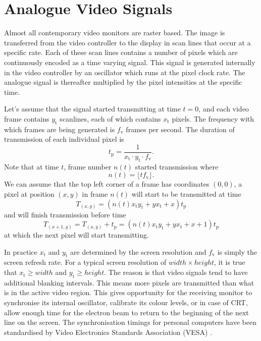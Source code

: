 \documentclass[a4paper,12pt,twoside,openright]{report}
\begin{document}
\section{Analogue Video Signals}

Almost all contemporary video monitors are raster based. The image is transferred from the video controller to the display in scan lines that occur at a specific rate. Each of these scan lines contains a number of pixels which are continuously encoded as a time varying signal. This signal is generated internally in the video controller by an oscillator which runs at the pixel clock rate. The analogue signal is thereafter multiplied by the pixel intensities at the specific time.

Let's assume that the signal started transmitting at time $t=0$, and each video frame contains $y_\text{t}$ scanlines, each of which contains $x_\text{t}$ pixels. The frequency with which frames are being generated is $f_\text{v}$ frames per second. The duration of transmission of each individual pixel is \begin{equation}
\label{eq:tdelta_definition}
t_\text{p}=\frac{1}{x_\text{t} \cdot y_\text{t} \cdot f_\text{v}} .
\end{equation}
Note that at time $t$, frame number $n(t)$ started transmission where 
\begin{equation}
n(t)=\lfloor t f_\text{v} \rfloor .
\end{equation}
We can assume that the top left corner of a frame has coordinates $(0, 0)$, a pixel at position $(x, y)$ in frame $n(t)$ will start to be transmitted at time
\begin{equation}
T_{(x,y)}= (n(t) x_\text{t} y_\text{t} + y x_\text{t} + x) t_\text{p}
\end{equation}
and will finish transmission before time 
\begin{equation}
T_{(x+1,y)} = T_{(x,y)} + t_\text{p} =(n(t) x_\text{t} y_\text{t} + y x_\text{t} + x + 1) t_\text{p}
\end{equation}
at which the next pixel will start transmitting.

In practice $x_\text{t}$ and $y_\text{t}$ are determined by the screen resolution and $f_\text{v}$ is simply the screen refresh rate. For a typical screen resolution of $width \times height$, it is true that $x_\text{t} \geq width$ and $y_\text{t} \geq height$. The reason is that video signals tend to have additional blanking intervals. This means more pixels are transmitted than what is in the active video region. This gives opportunity for the receiving monitor to synchronise its internal oscillator, calibrate its colour levels, or in case of CRT, allow enough time for the electron beam to return to the beginning of the next line on the screen. The synchronisation timings for personal computers have been standardised by Video Electronics Standards Association (VESA) \cite{vesa}.
\end{document}
